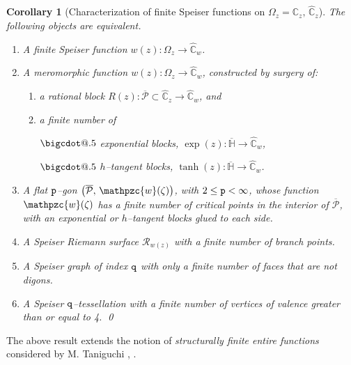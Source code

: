 \documentclass[final,3p,times]{elsarticle}
\makeatletter
\newcommand{\CC}{\ensuremath{{\mathbb C}}}
\newcommand{\CW}{\ensuremath{{\widehat{\mathbb C}}}}
\newcommand{\HH}{\ensuremath{{\mathbb H}}}
\newcommand{\R}{\ensuremath{{\mathcal R}}}
\newcommand*\bigcdot{\mathpalette\bigcdot@{.5}}
\newcommand*\bigcdot@[2]{\mathbin{\vcenter{\hbox{\scalebox{#2}{$\m@th#1\bullet$}}}}}
\newtheorem{corollary}[theorem]{Corollary}
\theoremstyle{definition}
\makeatother
\begin{document}
\begin{corollary}[Characterization of finite Speiser functions on
$\Omega_z=\CC_z, \, \CW_z$]
\label{Cor:caract-Speiser-finitas}
The following objects are equivalent.
\begin{enumerate}[label=\arabic*),leftmargin=*]

\item 
A finite Speiser function $w(z):\Omega_z\longrightarrow \CW_w$.


\item 
A meromorphic function $w(z):\Omega_z\longrightarrow \CW_w$, 
constructed by surgery of: 

\begin{enumerate}[label=\alph*),leftmargin=*]
\vspace{0.1cm}
\item 
a rational block 
$R(z) : \overline{ \mathscr{P}} \subset \CW_z 
\longrightarrow \CW_w$, and 

\item a finite number of 

\noindent 
$\bigcdot$
exponential blocks, 
$\exp(z):\overline{\HH}  \longrightarrow \CW_w$, 


\noindent 
$\bigcdot$
$h$--tangent blocks, 
$\tanh(z):\overline{\HH} \longrightarrow \CW_w$.
\end{enumerate}


\item
A flat ${\tt p}$--gon $\big(\overline{\mathcal{P}}, \, \mathpzc{w} (\zeta) \big)$,
with $2 \leq {\tt p} < \infty$,
whose function $\mathpzc{w} (\zeta)$ has
a finite number of critical points
in the interior of $\overline{\mathcal{P}}$,
with an exponential or $h$--tangent blocks glued 
to each side.

\item
A Speiser Riemann surface $\R_{w(z)}$ with a finite number of branch points.

\item
A Speiser graph of index $\tt q$ with only a finite number of faces that are not digons.

\item 
A Speiser $\tt q$--tessellation with a finite number of vertices of valence 
greater than or equal to 4.
\hfill\qed
\end{enumerate}
\end{corollary}


The above result extends the notion of
\emph{structurally finite entire functions} considered
by M. Taniguchi \cite{Taniguchi1}, \cite{Taniguchi2}.
\end{document}
